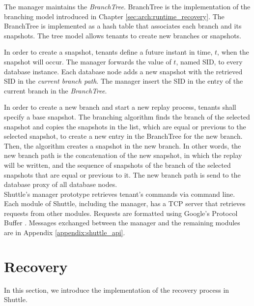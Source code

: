 The manager maintains the \textit{BranchTree}. BranchTree is the implementation of the branching model introduced in Chapter \ref{sec:arch:runtime_recovery}. The BranchTree is implemented as a hash table that associates each branch and its snapshots. The tree model allows tenants to create new branches or snapshots.

In order to create a snapshot, tenants define a future instant in time, $t$, when the snapshot will occur. The manager forwards the value of $t$, named \ac{SID}, to every database instance. Each database node adds a new snapshot with the retrieved \ac{SID} in the \emph{current branch path}. The manager insert the \ac{SID} in the entry of the current branch in the \emph{BranchTree}.

In order to create a new branch and start a new replay process, tenants shall specify a base snapshot. The branching algorithm finds the branch of the selected snapshot and copies the snapshots in the list, which are equal or previous to the selected snapshot, to create a new entry in the BranchTree for the new branch. Then, the algorithm creates a snapshot in the new branch. In other words, the new branch path is the concatenation of the new snapshot, in which the replay will be written, and the sequence of snapshots of the branch of the selected snapshots that are equal or previous to it. The new branch path is send to the database proxy of all database nodes.\\


Shuttle's manager prototype retrieves tenant's commands via command line. Each module of Shuttle, including the manager, has a TCP server that retrieves requests from other modules. Requests are formatted using Google's Protocol Buffer \cite{protobuffers}. Messages exchanged between the manager and the remaining modules are in Appendix \ref{appendix:shuttle_api}. 



\section{Recovery}\label{sec:impl:recovery}
In this section, we introduce the implementation of the recovery process in Shuttle.\\

